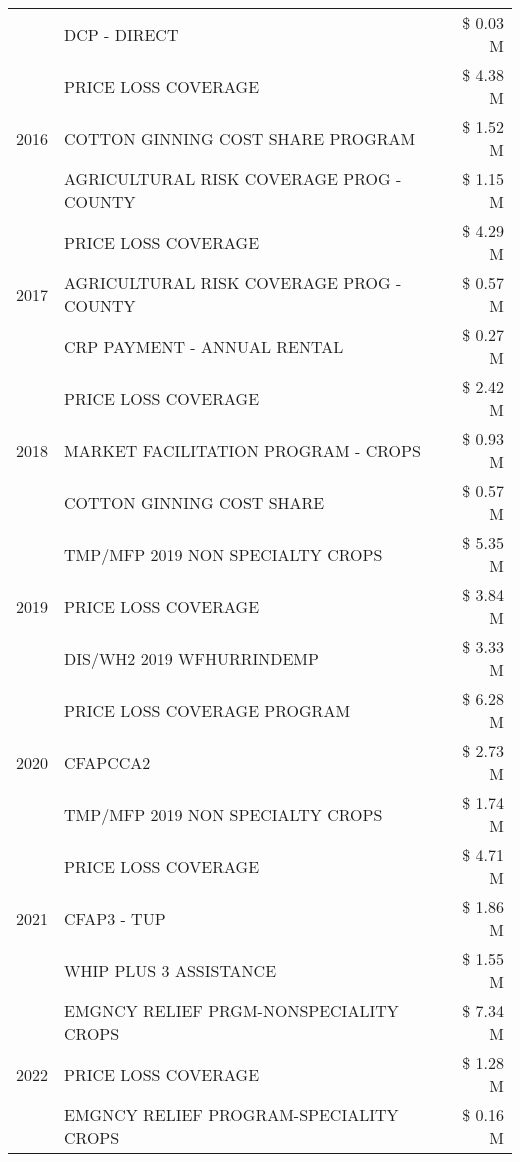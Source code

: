 \begin{tabular}{llr}
 & DCP - DIRECT & \$ 0.03 M \\
\cline{1-3}
\multirow[t]{3}{*}{2016} & PRICE LOSS COVERAGE & \$ 4.38 M \\
 & COTTON GINNING COST SHARE PROGRAM & \$ 1.52 M \\
 & AGRICULTURAL RISK COVERAGE PROG - COUNTY & \$ 1.15 M \\
\cline{1-3}
\multirow[t]{3}{*}{2017} & PRICE LOSS COVERAGE & \$ 4.29 M \\
 & AGRICULTURAL RISK COVERAGE PROG - COUNTY & \$ 0.57 M \\
 & CRP PAYMENT - ANNUAL RENTAL & \$ 0.27 M \\
\cline{1-3}
\multirow[t]{3}{*}{2018} & PRICE LOSS COVERAGE & \$ 2.42 M \\
 & MARKET FACILITATION PROGRAM - CROPS & \$ 0.93 M \\
 & COTTON GINNING COST SHARE & \$ 0.57 M \\
\cline{1-3}
\multirow[t]{3}{*}{2019} & TMP/MFP 2019 NON SPECIALTY CROPS & \$ 5.35 M \\
 & PRICE LOSS COVERAGE & \$ 3.84 M \\
 & DIS/WH2 2019 WFHURRINDEMP & \$ 3.33 M \\
\cline{1-3}
\multirow[t]{3}{*}{2020} & PRICE LOSS COVERAGE PROGRAM & \$ 6.28 M \\
 & CFAPCCA2 & \$ 2.73 M \\
 & TMP/MFP 2019 NON SPECIALTY CROPS & \$ 1.74 M \\
\cline{1-3}
\multirow[t]{3}{*}{2021} & PRICE LOSS COVERAGE & \$ 4.71 M \\
 & CFAP3 - TUP & \$ 1.86 M \\
 & WHIP PLUS 3 ASSISTANCE & \$ 1.55 M \\
\cline{1-3}
\multirow[t]{3}{*}{2022} & EMGNCY RELIEF PRGM-NONSPECIALITY CROPS & \$ 7.34 M \\
 & PRICE LOSS COVERAGE & \$ 1.28 M \\
 & EMGNCY RELIEF PROGRAM-SPECIALITY CROPS & \$ 0.16 M \\
\cline{1-3}
\bottomrule
\end{tabular}
